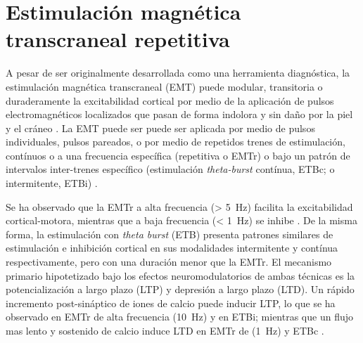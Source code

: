 \section{Estimulación magnética transcraneal repetitiva}
A pesar de ser originalmente desarrollada como una herramienta diagnóstica, la estimulación magnética transcraneal (EMT) puede modular, transitoria o duraderamente la excitabilidad cortical por medio de la aplicación de pulsos electromagnéticos localizados que pasan de forma indolora y sin daño por la piel y el cráneo \parencite{Horvath2011a, Noohi2016}.
La EMT puede ser puede ser aplicada por medio de pulsos individuales, pulsos pareados, o por medio de repetidos trenes de estimulación, contínuos o a una frecuencia específica (repetitiva o EMTr) o bajo un patrón de intervalos inter-trenes específico (estimulación \textit{theta-burst} contínua, ETBc; o intermitente, ETBi) \parencite{Ekhtiari2019}. \par
Se ha observado que la EMTr a alta frecuencia (\deactivatequoting\SI{> 5}{\hertz}\activatequoting) facilita la excitabilidad cortical-motora, mientras que a baja frecuencia (\deactivatequoting\SI{< 1}{\hertz}\activatequoting) se inhibe \parencite{Pascual-Leone1994}.
De la misma forma, la estimulación con \textit{theta burst} (ETB) presenta patrones similares de estimulación e inhibición cortical en sus modalidades intermitente y contínua respectivamente, pero con una duración menor que la EMTr. El mecanismo primario hipotetizado bajo los efectos neuromodulatorios de ambas técnicas es la potencialización a largo plazo (LTP) y depresión a largo plazo (LTD).
Un rápido incremento post-sináptico de iones de calcio puede inducir LTP, lo que se ha observado en EMTr de alta frecuencia (\SI{10}{\hertz}) y en ETBi; mientras que un flujo mas lento y sostenido de calcio induce LTD en EMTr de (\SI{1}{\hertz}) y ETBc \parencite{Ekhtiari2019}.

